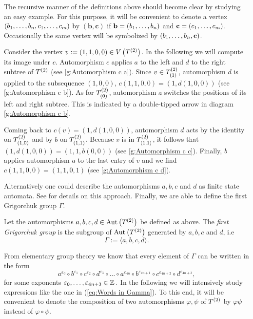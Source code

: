 The recursive manner of the definitions above should become clear by studying an easy example. For this purpose, it will be convenient to denote a vertex $(\seq{b},\seq[m]{c})$ by $(\mathbf{b},\mathbf{c})$ if $\mathbf{b}=(\seq{b})$ and $\mathbf{c}=(\seq[m]{c})$. Occasionally the same vertex will be symbolized by $(\seq{b},\mathbf{c})$.
\begin{exam}
Consider the vertex $v:=(1,1,0,0)\in\VT$. In the following we will compute its image under $c$. Automorphism $c$ applies $a$ to the left and $d$ to the right subtree of $\T$ (see \cref{g:Automorphism c a}). Since $v\in\ST{(1)}$, automorphism $d$ is applied to the subsequence $(1,0,0)$, \ie $c(1,1,0,0)=(1,d(1,0,0))$ (see \cref{g:Automorphism c b}). As for $\ST{(0)}$, automorphism $a$ switches the positions of its left and right subtree. This is indicated by a double-tipped arrow in diagram \ref{g:Automorphism c b}.

Coming back to $c(v)=(1,d(1,0,0))$, automorphism $d$ acts by the identity on $\ST{(1,0)}$ and by $b$ on $\ST{(1,1)}$. Because $v$ is in $\ST{(1,1)}$, it follows that $(1,d(1,0,0))=(1,1,b(0,0))$ (see \cref{g:Automorphism c c}). Finally, $b$ applies automorphism $a$ to the last entry of $v$ and we find $c(1,1,0,0)=(1,1,0,1)$ (see \cref{g:Automorphism c d}).
\end{exam}

Alternatively one could describe the automorphisms $a,b,c$ and $d$ as finite state automata. See \cite{de2000topics} for details on this approach. Finally, we are able to define the first Grigorchuk group $\Gamma$.
\begin{defin}
Let the automorphisms $a,b,c,d\in\AutT$ be defined as above. The \emph{first Grigorchuk group} is the subgroup of $\AutT$ generated by $a,b,c$ and $d$, i.e
\begin{equation*}
\Gamma:=\langle a,b,c,d\rangle.
\end{equation*}
\end{defin}

From elementary group theory we know that every element of $\Gamma$ can be written in the form
\begin{equation}\label{eq:Words in Gamma}
a^{\varepsilon_0}\circ b^{\varepsilon_1}\circ c^{\varepsilon_2}\circ d^{\varepsilon_3}\circ\ldots\circ a^{\varepsilon_{4n}}\circ b^{\varepsilon_{4n+1}}\circ c^{\varepsilon_{4n+2}}\circ d^{\varepsilon_{4n+3}},
\end{equation}
for some exponents $\varepsilon_0,\ldots,\varepsilon_{4n+3}\in\Z.$ In the following we will intensively study expressions like the one in (\ref{eq:Words in Gamma}). To this end, it will be convenient to denote the composition of two automorphisms $\varphi,\psi$ of $\T$ by $\varphi\psi$ instead of $\varphi\circ\psi.$

